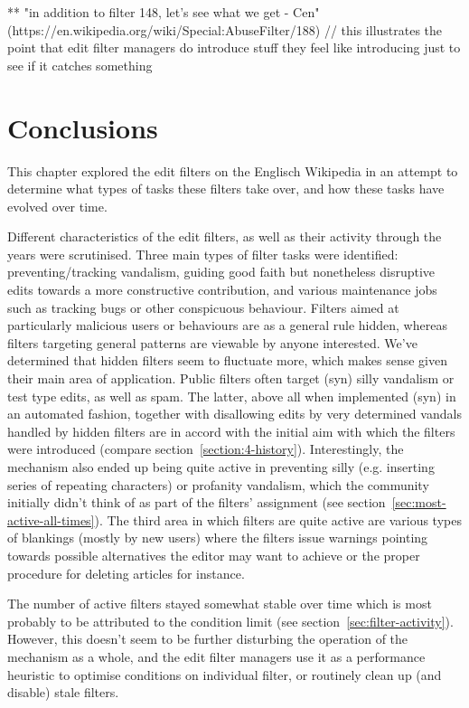   ** "in addition to filter 148, let's see what we get - Cen" (https://en.wikipedia.org/wiki/Special:AbuseFilter/188) // this illustrates the point that edit filter managers do introduce stuff they feel like introducing just to see if it catches something


\section{Conclusions}

This chapter explored the edit filters on the Englisch Wikipedia in an attempt to determine what types of tasks these filters take over,
and how these tasks have evolved over time.

Different characteristics of the edit filters, as well as their activity through the years were scrutinised.
Three main types of filter tasks were identified: preventing/tracking vandalism, guiding good faith but nonetheless disruptive edits towards a more constructive contribution, and various maintenance jobs such as tracking bugs or other conspicuous behaviour.
Filters aimed at particularly malicious users or behaviours are as a general rule hidden, whereas filters targeting general patterns are viewable by anyone interested.
We've determined that hidden filters seem to fluctuate more, which makes sense given their main area of application.
Public filters often target (syn) silly vandalism or test type edits, as well as spam.
The latter, above all when implemented (syn) in an automated fashion, together with disallowing edits by very determined vandals handled by hidden filters are in accord with the initial aim with which the filters were introduced (compare section~\ref{section:4-history}).
Interestingly, the mechanism also ended up being quite active in preventing silly (e.g. inserting series of repeating characters) or profanity vandalism, which the community initially didn't think of as part of the filters' assignment (see section~\ref{sec:most-active-all-times}).
The third area in which filters are quite active are various types of blankings (mostly by new users) where the filters issue warnings pointing towards possible alternatives the editor may want to achieve or the proper procedure for deleting articles for instance.

The number of active filters stayed somewhat stable over time which is most probably to be attributed to the condition limit (see section~\ref{sec:filter-activity}).
However, this doesn't seem to be further disturbing the operation of the mechanism as a whole,
and %
the edit filter managers use it as a performance heuristic to optimise conditions on individual filter, or routinely clean up (and disable) stale filters.

